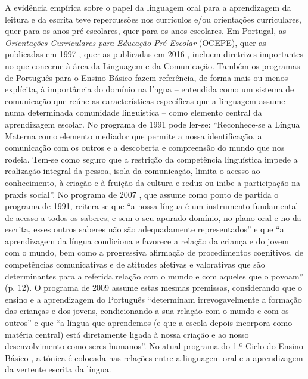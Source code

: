 \documentclass[output=paper]{LSP/langsci}
\begin{document}
A evidência empírica sobre o papel da linguagem oral para a aprendizagem da leitura e da escrita teve repercussões nos currículos e/ou orientações curriculares, quer para os anos pré-escolares, quer para os anos escolares. Em Portugal, as \textit{Orientações Curriculares para Educação Pré-Escolar} (OCEPE), quer as publicadas em 1997 \citep{ministerioedu2007}, quer as publicadas em 2016 \citep{silva_etal2016}, incluem diretrizes importantes no que concerne à área da Linguagem e da Comunicação. Também os programas de Português para o Ensino Básico fazem referência, de forma mais ou menos explícita, à importância do domínio na língua – entendida como um sistema de comunicação que reúne as características específicas que a linguagem assume numa determinada comunidade linguística – como elemento central da aprendizagem escolar. No programa de 1991 \citep[97]{ministerioedu1991} pode ler-se: “Reconhece-se a Língua Materna como elemento mediador que permite a nossa identificação, a comunicação com os outros e a descoberta e compreensão do mundo que nos rodeia. Tem-se como seguro que a restrição da competência linguística impede a realização integral da pessoa, isola da comunicação, limita o acesso ao conhecimento, à criação e à fruição da cultura e reduz ou inibe a participação na praxis social”. No programa de 2007 \citep[6]{ministerioedu2007}, que assume como ponto de partida o programa de 1991, reitera-se que “a nossa língua é um instrumento fundamental de acesso a todos os saberes; e sem o seu apurado domínio, no plano oral e no da escrita, esses outros saberes não são adequadamente representados” e que “a aprendizagem da língua condiciona e favorece a relação da criança e do jovem com o mundo, bem como a progressiva afirmação de procedimentos cognitivos, de competências comunicativas e de atitudes afetivas e valorativas que são determinantes para a referida relação com o mundo e com aqueles que o povoam” (p. 12). O programa de 2009 \citep[6]{ministerioedu2009} assume estas mesmas premissas, considerando que o ensino e a aprendizagem do Português “determinam irrevogavelmente a formação das crianças e dos jovens, condicionando a sua relação com o mundo e com os outros” e que “a língua que aprendemos (e que a escola depois incorpora como matéria central) está diretamente ligada à nossa criação e ao nosso desenvolvimento como seres humanos”. No atual programa do 1.º Ciclo do Ensino Básico \citep{buescu_etal2015}, a tónica é colocada nas relações entre a linguagem oral e a aprendizagem da vertente escrita da língua.\newpage
\end{document}
